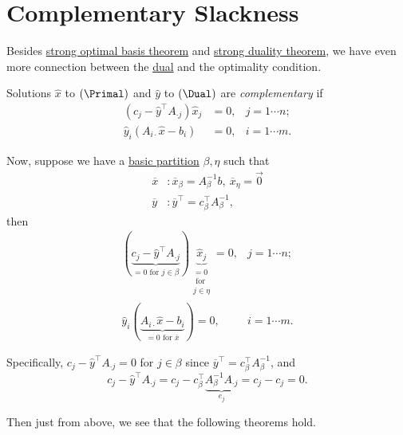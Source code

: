 \section{Complementary Slackness}
Besides \hyperref[thm:strong-optimal-basis]{strong optimal basis theorem} and \hyperref[thm:strong-duality]{strong duality theorem}, we have even more connection between the \hyperref[def:dual]{dual} and the optimality condition.

\begin{definition}[Complementary]\label{def:complementary}
	Solutions \(\hat{x}\) to \((\Primal)\) and \(\hat{y}\) to \((\Dual)\) are \emph{complementary} if
	\[
		\begin{aligned}
			(c_{j} - \hat{y}^{\top} A_{\cdot j}) \hat{x}_j & = 0, & j = 1\cdots n; \\
			\hat{y}_i(A_{i\cdot} \hat{x} - b_{i})          & = 0, & i = 1\cdots m.
		\end{aligned}
	\]
\end{definition}
Now, suppose we have a \hyperref[def:basic-partition]{basic partition} \(\beta, \eta\) such that
\[
	\begin{split}
		\overline{x} & \colon \overline{x}_{\beta} = A^{-1}_{\beta}b,\ \overline{x}_{\eta} = \vec{0} \\
		\overline{y} & \colon \overline{y}^{\top} = c^{\top}_{\beta}A^{-1}_{\beta},
	\end{split}
\]
then
\[
	\begin{split}
		(\underbrace{c_{j} - \hat{y}^{\top} A_{\cdot j}}_{ = 0\text{ for }j\in \beta}) \underbrace{\hat{x}_j}_{ \substack{= 0 \\\text{ for }\\j\in \eta}} = 0, & j = 1\cdots n; \\
		\hat{y}_i(\underbrace{A_{i\cdot} \hat{x} - b_{i}}_{ = 0 \text{ for }\overline{x}}) = 0, & i = 1\cdots m.
	\end{split}
\]

\begin{note}
	Specifically, \(c_{j} - \hat{y}^{\top}A_{\cdot j} = 0\) for \(j\in\beta\) since \(\overline{y}^{\top} = c^{\top}_{\beta}A^{-1}_{\beta}\), and
	\[
		c_{j} - \hat{y}^{\top}A_{\cdot j} = c_{j} - c^{\top}_{\beta}\underbrace{A^{-1}_{\beta}A_{\cdot j}}_{e_{j}} = c_{j} - c_{j} = 0.
	\]
\end{note}

Then just from above, we see that the following theorems hold.

